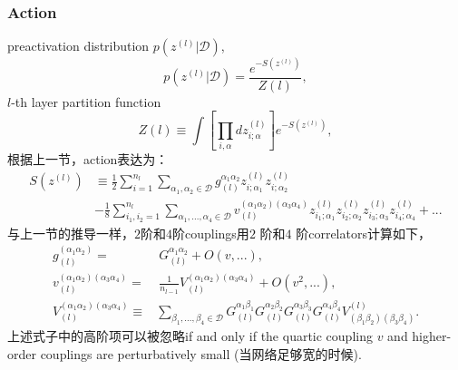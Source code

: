 \subsubsection{Action}
preactivation distribution $p\left(z^{(l)}\big| \mathcal{D}\right)$,
\begin{equation}
    p\left(z^{(l)}\big| \mathcal{D}\right) = \frac{e^{-S(z^{(l)})}}{Z(l)},
\end{equation}
$l$-th layer partition function 
\begin{equation}
    Z(l) \equiv \int \left[\prod_{i,\alpha}dz_{i;\alpha}^{(l)}\right]e^{-S(z^{(l)})},
\end{equation}
根据上一节，action表达为：
\begin{equation}
    \begin{aligned}
    S(z^{(l)}) &\equiv \frac{1}{2}\sum_{i=1}^{n_l}\sum_{\alpha_1,\alpha_2\in \mathcal{D}}
    g_{(l)}^{\alpha_1\alpha_2}z_{i;\alpha_1}^{(l)}z_{i;\alpha_2}^{(l)} \\
    &- \frac{1}{8}\sum_{i_1,i_2=1}^{n_l}\sum_{\alpha_1,...,\alpha_4\in \mathcal{D}}
    v_{(l)}^{(\alpha_1\alpha_2)(\alpha_3\alpha_4)}z_{i_1;\alpha_1}^{(l)}z_{i_2;\alpha_2}^{(l)}
    z_{i_3;\alpha_3}^{(l)}z_{i_4;\alpha_4}^{(l)} + ...
    \end{aligned}
\end{equation}
与上一节的推导一样，$2$阶和$4$阶couplings用$2$ 阶和$4$ 阶correlators计算如下，
\begin{equation}
    \begin{aligned}
    g_{(l)}^{(\alpha_1\alpha_2)} = &~ G_{(l)}^{\alpha_1\alpha_2} + O(v,...), \\
    v_{(l)}^{(\alpha_1\alpha_2)(\alpha_3\alpha_4)} = &~ \frac{1}{n_{l-1}}
    V_{(l)}^{(\alpha_1\alpha_2)(\alpha_3\alpha_4)} + O(v^2,...), \\
    V_{(l)}^{(\alpha_1\alpha_2)(\alpha_3\alpha_4)} \equiv & \sum_{\beta_1,...,\beta_4\in 
    \mathcal{D}} G_{(l)}^{\alpha_1\beta_1}G_{(l)}^{\alpha_2\beta_2}
    G_{(l)}^{\alpha_3\beta_3}G_{(l)}^{\alpha_4\beta_4}
    V_{(\beta_1\beta_2)(\beta_3\beta_4)}^{(l)}.
    \end{aligned}
    \label{eq:ch4_coupling_layer_l}
\end{equation}
上述式子中的高阶项可以被忽略if and only if the quartic coupling 
$v$ and higher-order couplings are perturbatively small (当网络足够宽的时候).

